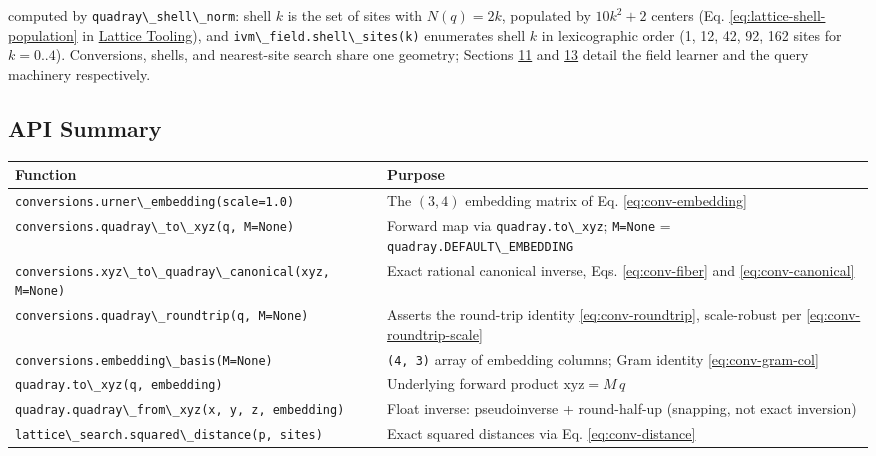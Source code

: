\documentclass[
  10pt,
]{article}
\newcommand{\passthrough}[1]{#1}
\newcounter{none} %
\begin{document}
computed by \passthrough{\lstinline!quadray\_shell\_norm!}: shell \(k\)
is the set of sites with \(N(q) = 2k\), populated by \(10k^2 + 2\)
centers (Eq. \eqref{eq:lattice-shell-population} in
\href{13_lattice_tooling.md}{Lattice Tooling}), and
\passthrough{\lstinline!ivm\_field.shell\_sites(k)!} enumerates shell
\(k\) in lexicographic order (1, 12, 42, 92, 162 sites for
\(k = 0..4\)). Conversions, shells, and nearest-site search share one
geometry; Sections \href{11_ivm_field_learning.md}{11} and
\href{13_lattice_tooling.md}{13} detail the field learner and the query
machinery respectively.

\subsection{API Summary}\label{api-summary-1}

{\def\LTcaptype{none} %
\begin{longtable}[]{@{}
  >{\raggedright\arraybackslash}p{}
  >{\raggedright\arraybackslash}p{}@{}}
\toprule\noalign{}
\begin{minipage}[b]{\linewidth}\raggedright
Function
\end{minipage} & \begin{minipage}[b]{\linewidth}\raggedright
Purpose
\end{minipage} \\
\midrule\noalign{}
\endhead
\bottomrule\noalign{}
\endlastfoot
\passthrough{\lstinline!conversions.urner\_embedding(scale=1.0)!} & The
\((3, 4)\) embedding matrix of Eq. \eqref{eq:conv-embedding} \\
\passthrough{\lstinline!conversions.quadray\_to\_xyz(q, M=None)!} &
Forward map via \passthrough{\lstinline!quadray.to\_xyz!};
\passthrough{\lstinline!M=None!} =
\passthrough{\lstinline!quadray.DEFAULT\_EMBEDDING!} \\
\passthrough{\lstinline!conversions.xyz\_to\_quadray\_canonical(xyz, M=None)!}
& Exact rational canonical inverse, Eqs. \eqref{eq:conv-fiber} and
\eqref{eq:conv-canonical} \\
\passthrough{\lstinline!conversions.quadray\_roundtrip(q, M=None)!} &
Asserts the round-trip identity \eqref{eq:conv-roundtrip}, scale-robust
per \eqref{eq:conv-roundtrip-scale} \\
\passthrough{\lstinline!conversions.embedding\_basis(M=None)!} &
\passthrough{\lstinline!(4, 3)!} array of embedding columns; Gram
identity \eqref{eq:conv-gram-col} \\
\passthrough{\lstinline!quadray.to\_xyz(q, embedding)!} & Underlying
forward product \(\mathrm{xyz} = M\,q\) \\
\passthrough{\lstinline!quadray.quadray\_from\_xyz(x, y, z, embedding)!}
& Float inverse: pseudoinverse + round-half-up (snapping, not exact
inversion) \\
\passthrough{\lstinline!lattice\_search.squared\_distance(p, sites)!} &
Exact squared distances via Eq. \eqref{eq:conv-distance} \\
\end{longtable}
}
\end{document}
